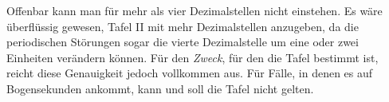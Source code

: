 Offenbar kann man für mehr als vier Dezimalstellen nicht einstehen. Es wäre überflüssig gewesen, Tafel II mit mehr Dezimalstellen anzugeben, da die periodischen Störungen sogar die vierte Dezimalstelle um eine oder zwei Einheiten verändern können. Für den \emph{Zweck}, für den die Tafel bestimmt ist, reicht diese Genauigkeit jedoch vollkommen aus. Für Fälle, in denen es auf Bogensekunden ankommt, kann und soll die Tafel nicht gelten.
\clearpage
{}%
\begin{center}
\begingroup\setlength{\fboxsep}{1.2pt}\setlength{\fboxrule}{0.45pt}
\end{center}
